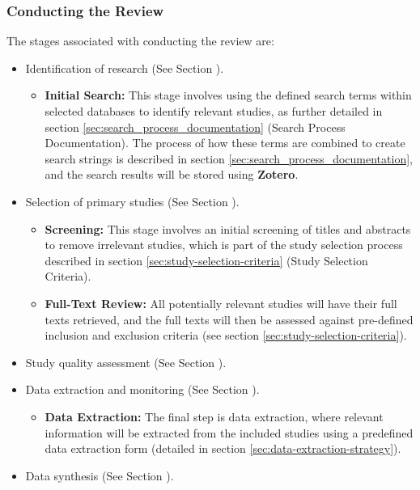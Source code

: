 \subsubsection{Conducting the Review}
The stages associated with conducting the review are:
\begin{itemize}
	\item Identification of research (See Section ).
	      \begin{itemize}
		      \item \textbf{Initial Search:} This stage involves using the defined search terms within selected
		            databases to identify relevant studies, as further detailed in section \ref{sec:search_process_documentation} (Search Process Documentation). The process of how these terms are combined to create search
		            strings is described in section \ref{sec:search_process_documentation}, and the search results will be stored using \textbf{Zotero}.
	      \end{itemize}
	\item Selection of primary studies (See Section ).
	      \begin{itemize}
		      \item \textbf{Screening:} This stage involves an initial screening of titles and abstracts to remove
		            irrelevant studies, which is part of the study selection process described in section \ref{sec:study-selection-criteria} (Study Selection Criteria).
		      \item \textbf{Full-Text Review:} All potentially relevant studies will have their full texts retrieved,
		            and the full texts will then be assessed against pre-defined inclusion and exclusion criteria (see section \ref{sec:study-selection-criteria}).
	      \end{itemize}
	\item Study quality assessment (See Section ).
	\item Data extraction and monitoring (See Section ).
	      \begin{itemize}
		      \item \textbf{Data Extraction:} The final step is data extraction, where relevant information will be
		            extracted from the included studies using a predefined data extraction form (detailed in section \ref{sec:data-extraction-strategy}).
	      \end{itemize}
	\item Data synthesis (See Section ).
\end{itemize}

